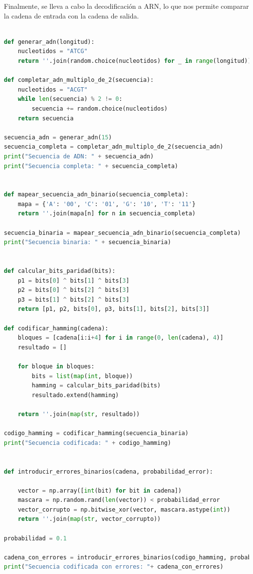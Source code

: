 Finalmente, se lleva a cabo la decodificación a ARN, lo que nos permite comparar la cadena de entrada con la cadena de salida.\\
\begin{lstlisting}[language=Python]

def generar_adn(longitud):
    nucleotidos = "ATCG"
    return ''.join(random.choice(nucleotidos) for _ in range(longitud))

def completar_adn_multiplo_de_2(secuencia):
    nucleotidos = "ACGT"
    while len(secuencia) % 2 != 0:
        secuencia += random.choice(nucleotidos)
    return secuencia

secuencia_adn = generar_adn(15)
secuencia_completa = completar_adn_multiplo_de_2(secuencia_adn)
print("Secuencia de ADN: " + secuencia_adn)
print("Secuencia completa: " + secuencia_completa)


def mapear_secuencia_adn_binario(secuencia_completa):
    mapa = {'A': '00', 'C': '01', 'G': '10', 'T': '11'}
    return ''.join(mapa[n] for n in secuencia_completa)

secuencia_binaria = mapear_secuencia_adn_binario(secuencia_completa)
print("Secuencia binaria: " + secuencia_binaria)


def calcular_bits_paridad(bits):
    p1 = bits[0] ^ bits[1] ^ bits[3]
    p2 = bits[0] ^ bits[2] ^ bits[3]
    p3 = bits[1] ^ bits[2] ^ bits[3]
    return [p1, p2, bits[0], p3, bits[1], bits[2], bits[3]]

def codificar_hamming(cadena):
    bloques = [cadena[i:i+4] for i in range(0, len(cadena), 4)]
    resultado = []

    for bloque in bloques:
        bits = list(map(int, bloque))
        hamming = calcular_bits_paridad(bits)
        resultado.extend(hamming)

    return ''.join(map(str, resultado))

codigo_hamming = codificar_hamming(secuencia_binaria)
print("Secuencia codificada: " + codigo_hamming)


def introducir_errores_binarios(cadena, probabilidad_error):

    vector = np.array([int(bit) for bit in cadena])
    mascara = np.random.rand(len(vector)) < probabilidad_error
    vector_corrupto = np.bitwise_xor(vector, mascara.astype(int))
    return ''.join(map(str, vector_corrupto))

probabilidad = 0.1

cadena_con_errores = introducir_errores_binarios(codigo_hamming, probabilidad)
print("Secuencia codificada con errores: "+ cadena_con_errores)


\end{lstlisting}
